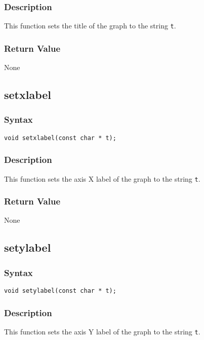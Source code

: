\documentclass[dvips,11pt,fleqn]{report}
\begin{document}
\subsubsection*{Description}
This function sets the title of the graph to the string {\tt t}.

\subsubsection*{Return Value}

None

\newpage

\subsection*{setxlabel}
\subsubsection*{Syntax}
\begin{verbatim}
void setxlabel(const char * t);
\end{verbatim}
\subsubsection*{Description}
This function sets the axis X label of the graph to the string {\tt t}.

\subsubsection*{Return Value}

None

\newpage

\subsection*{setylabel}
\subsubsection*{Syntax}
\begin{verbatim}
void setylabel(const char * t);
\end{verbatim}
\subsubsection*{Description}
This function sets the axis Y label of the graph to the string {\tt t}.
\end{document}
